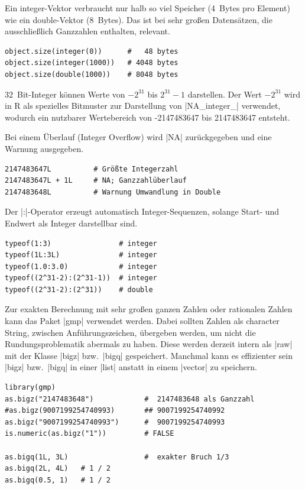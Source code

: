 \documentclass[10pt,twocolumn]{scrartcl}
\renewcommand{\lstinline}{\mycoloredinline}
\begin{document}
Ein integer-Vektor verbraucht nur halb so viel Speicher (4~Bytes pro Element) wie ein double-Vektor (8~Bytes). Das ist bei sehr großen Datensätzen, die ausschließlich Ganzzahlen enthalten, relevant.

\begin{lstlisting}
object.size(integer(0))      #   48 bytes
object.size(integer(1000))   # 4048 bytes
object.size(double(1000))    # 8048 bytes
\end{lstlisting}

32~Bit-Integer können Werte von $-2^{31}$ bis $2^{31}-1$ darstellen.
Der Wert $-2^{31}$ wird in R als spezielles Bitmuster zur Darstellung von
\lstinline|NA_integer_| verwendet, wodurch ein nutzbarer Wertebereich von -2147483647 bis 2147483647 entsteht.

Bei einem Überlauf (Integer Overflow) wird \lstinline|NA| zurückgegeben und eine Warnung ausgegeben.

\begin{lstlisting}
2147483647L          # Größte Integerzahl
2147483647L + 1L     # NA; Ganzzahlüberlauf
2147483648L          # Warnung Umwandlung in Double
\end{lstlisting}

Der \lstinline|:|-Operator erzeugt automatisch Integer-Sequenzen,
solange Start- und Endwert als Integer darstellbar sind.

\begin{lstlisting}
typeof(1:3)                # integer
typeof(1L:3L)              # integer
typeof(1.0:3.0)            # integer
typeof((2^31-2):(2^31-1))  # integer
typeof((2^31-2):(2^31))    # double
\end{lstlisting}

Zur exakten Berechnung mit sehr großen ganzen Zahlen oder rationalen Zahlen kann das Paket \lstinline|gmp| verwendet werden. Dabei sollten Zahlen als character String, zwischen Anführungszeichen, übergeben werden, um nicht die Rundungsproblematik abermals zu haben. Diese werden derzeit intern als \lstinline|raw| mit der Klasse \lstinline|bigz| bzw.\ \lstinline|bigq| gespeichert. Manchmal kann es effizienter sein \lstinline|bigz| bzw.\ \lstinline|bigq| in einer \lstinline|list| anstatt in einem \lstinline|vector| zu speichern.

\begin{lstlisting}
library(gmp)
as.bigz("2147483648")            #  2147483648 als Ganzzahl
#as.bigz(9007199254740993)       ## 9007199254740992
as.bigz("9007199254740993")      #  9007199254740993
is.numeric(as.bigz("1"))         # FALSE

as.bigq(1L, 3L)                  #  exakter Bruch 1/3
as.bigq(2L, 4L)   # 1 / 2
as.bigq(0.5, 1)   # 1 / 2
\end{lstlisting}
\end{document}
